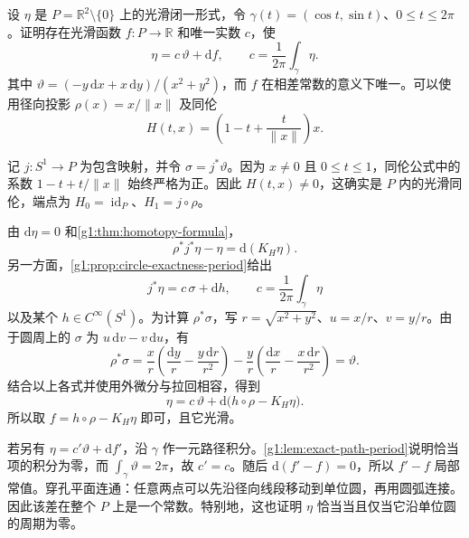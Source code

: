 \begin{exercise}\label{g1:ex:punctured-plane-closed-forms}
	设 \(\eta\) 是 \(P=\mathbb R^2\setminus\{0\}\) 上的光滑闭一形式，令 \(\gamma(t)=(\cos t,\sin t)\)、\(0\le t\le2\pi\)。证明存在光滑函数 \(f:P\to\mathbb R\) 和唯一实数 \(c\)，使
	\[
		\eta=c\,\vartheta+\mathrm{d}f,\qquad
		c=\frac1{2\pi}\int_\gamma\eta.
	\]
	其中 \(\vartheta=(-y\,\mathrm{d}x+x\,\mathrm{d}y)/(x^2+y^2)\)，而 \(f\) 在相差常数的意义下唯一。可以使用径向投影 \(\rho(x)=x/\lVert x\rVert\) 及同伦
	\[
		H(t,x)=\left(1-t+\frac{t}{\lVert x\rVert}\right)x.
	\]
\end{exercise}
\begin{solution}
	记 \(j:S^1\to P\) 为包含映射，并令 \(\sigma=j^*\vartheta\)。因为 \(x\ne0\) 且 \(0\le t\le1\)，同伦公式中的系数 \(1-t+t/\lVert x\rVert\) 始终严格为正。因此 \(H(t,x)\ne0\)，这确实是 \(P\) 内的光滑同伦，端点为 \(H_0=\operatorname{id}_P\)、\(H_1=j\circ\rho\)。

	由 \(\mathrm{d}\eta=0\) 和\cref{g1:thm:homotopy-formula}，
	\[
		\rho^*j^*\eta-\eta=\mathrm{d}(K_H\eta).
	\]
	另一方面，\cref{g1:prop:circle-exactness-period}给出
	\[
		j^*\eta=c\,\sigma+\mathrm{d}h,\qquad
		c=\frac1{2\pi}\int_\gamma\eta
	\]
	以及某个 \(h\in C^\infty(S^1)\)。为计算 \(\rho^*\sigma\)，写 \(r=\sqrt{x^2+y^2}\)、\(u=x/r\)、\(v=y/r\)。由于圆周上的 \(\sigma\) 为 \(u\,\mathrm{d}v-v\,\mathrm{d}u\)，有
	\[
		\rho^*\sigma
		=\frac{x}{r}\left(\frac{\mathrm{d}y}{r}-\frac{y\,\mathrm{d}r}{r^2}\right)
		-\frac{y}{r}\left(\frac{\mathrm{d}x}{r}-\frac{x\,\mathrm{d}r}{r^2}\right)
		=\vartheta.
	\]
	结合以上各式并使用外微分与拉回相容，得到
	\[
		\eta=c\,\vartheta+\mathrm{d}\bigl(h\circ\rho-K_H\eta\bigr).
	\]
	所以取 \(f=h\circ\rho-K_H\eta\) 即可，且它光滑。

	若另有 \(\eta=c'\vartheta+\mathrm{d}f'\)，沿 \(\gamma\) 作一元路径积分。\cref{g1:lem:exact-path-period}说明恰当项的积分为零，而 \(\int_\gamma\vartheta=2\pi\)，故 \(c'=c\)。随后 \(\mathrm{d}(f'-f)=0\)，所以 \(f'-f\) 局部常值。穿孔平面连通：任意两点可以先沿径向线段移动到单位圆，再用圆弧连接。因此该差在整个 \(P\) 上是一个常数。特别地，这也证明 \(\eta\) 恰当当且仅当它沿单位圆的周期为零。
\end{solution}

